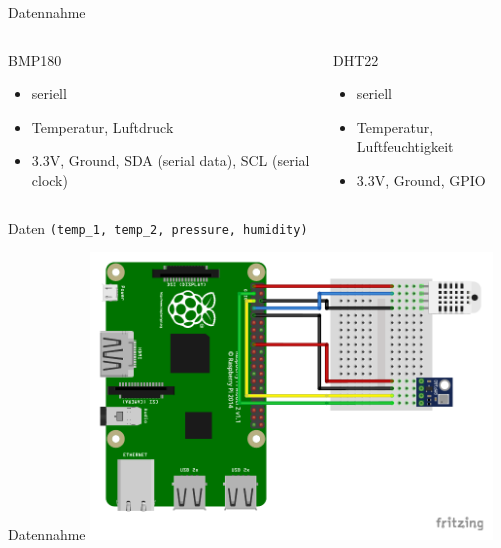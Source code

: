 \begin{frame}[t]{Datennahme}

  \begin{columns}[t,onlytextwidth]
    \begin{column}{0.48\textwidth}
      \begin{block}{BMP180}
        \begin{itemize}
          \item seriell
          \item Temperatur, Luftdruck
          \item 3.3V, Ground, SDA (serial data), SCL (serial clock)
        \end{itemize}
      \end{block}
    \end{column}
    \begin{column}{0.48\textwidth}
      \begin{block}{DHT22}
        \begin{itemize}
          \item seriell
          \item Temperatur, Luftfeuchtigkeit
          \item 3.3V, Ground, GPIO
        \end{itemize}
      \end{block}
    \end{column}
  \end{columns}

  \begin{block}{Daten}
    \centering
    \texttt{(temp\_1, temp\_2, pressure, humidity)}
  \end{block}

\end{frame}

\begin{frame}[t]{Datennahme}
  \centering
  \includegraphics[width=0.8\textwidth]{../weatherstation_rpi2.pdf}
\end{frame}
